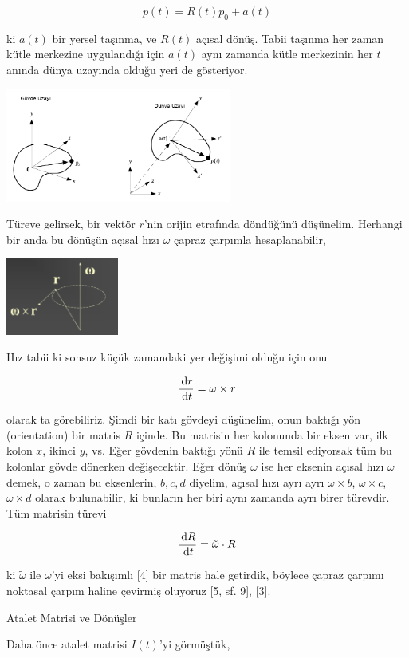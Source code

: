 \documentclass[12pt,fleqn]{article}\usepackage{../../common}
\begin{document}
$$
p(t) = R(t) p_0 + a(t)
$$

ki $a(t)$ bir yersel taşınma, ve $R(t)$ açısal dönüş. Tabii taşınma her zaman
kütle merkezine uygulandığı için $a(t)$ aynı zamanda kütle merkezinin her $t$
anında dünya uzayında olduğu yeri de gösteriyor.

\includegraphics[width=20em]{phy_005_basics_04_04.png}

Türeve gelirsek, bir vektör $r$'nin orijin etrafında döndüğünü
düşünelim. Herhangi bir anda bu dönüşün açısal hızı $\omega$ çapraz çarpımla
hesaplanabilir,

\includegraphics[width=10em]{phy_005_basics_04_03.png}

Hız tabii ki sonsuz küçük zamandaki yer değişimi olduğu için onu

$$
\frac{\,\mathrm{d} r}{\,\mathrm{d} t} = \omega \times r
$$

olarak ta görebiliriz. Şimdi bir katı gövdeyi düşünelim, onun baktığı yön
(orientation) bir matris $R$ içinde. Bu matrisin her kolonunda bir eksen var,
ilk kolon $x$, ikinci $y$, vs. Eğer gövdenin baktığı yönü $R$ ile temsil
ediyorsak tüm bu kolonlar gövde dönerken değişecektir. Eğer dönüş $\omega$ ise
her eksenin açısal hızı $\omega$ demek, o zaman bu eksenlerin, $b,c,d$ diyelim,
açısal hızı ayrı ayrı $\omega \times b$, $\omega \times c$, $\omega \times d$
olarak bulunabilir, ki bunların her biri aynı zamanda ayrı birer türevdir. Tüm
matrisin türevi

$$
\frac{\,\mathrm{d} R}{\,\mathrm{d} t} = \tilde \omega \cdot R
$$

ki $\tilde \omega$ ile $\omega$'yi eksi bakışımlı [4] bir matris hale getirdik,
böylece çapraz çarpımı noktasal çarpım haline çevirmiş oluyoruz [5, sf. 9], [3].

Atalet Matrisi ve Dönüşler

Daha önce atalet matrisi $I(t)$'yi görmüştük,
\end{document}
